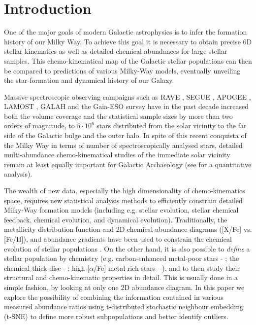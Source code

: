 \documentclass{aa}  %
\begin{document}
\section{Introduction}

One of the major goals of modern Galactic astrophysics is to infer the formation history of our Milky Way. To achieve this goal it is necessary to obtain precise 6D stellar kinematics as well as detailed chemical abundances for large stellar samples. This chemo-kinematical map of the Galactic stellar populations can then be compared to predictions of various Milky-Way models, eventually unveiling the star-formation and dynamical history of our Galaxy. 

Massive spectroscopic observing campaigns such as RAVE \citep{Steinmetz2006}, SEGUE \citep{Yanny2009}, APOGEE \citep{Majewski2017}, LAMOST \citep{Deng2012}, GALAH \citep{Martell2017} and the Gaia-ESO survey \citep{Gilmore2012} have in the past decade increased both the volume coverage and the statistical sample sizes by more than two orders of magnitude, to $5\cdot10^6$ stars distributed from the solar vicinity to the far side of the Galactic bulge and the outer halo. 
In spite of this recent conquista of the Milky Way in terms of number of spectroscopically analysed stars, detailed multi-abundance chemo-kinematical studies of the immediate solar vicinity \citep[e.g.]{Edvardsson1993, Fuhrmann1998, Fuhrmann2011, Fuhrmann2017, Adibekyan2012, Bensby2014, Nissen2015, Nissen2016, DelgadoMena2017} remain at least equally important for Galactic Archaeology (see \citealt{Lindegren2013} for a quantitative analysis).

The wealth of new data, especially the high dimensionality of chemo-kinematics space, requires new statistical analysis methods to efficiently constrain detailed Milky-Way formation models (including e.g. stellar evolution, stellar chemical feedback, chemical evolution, and dynamical evolution). Traditionally, the metallicity distribution function and 2D chemical-abundance diagrams ([X/Fe] vs. [Fe/H]), and abundance gradients have been used to constrain the chemical evolution of stellar populations \citep[e.g.][]{Pagel2009}. On the other hand, it is also possible to {\it define} a stellar population by chemistry (e.g. carbon-enhanced metal-poor stars - \citealt{Beers2005}; the chemical thick disc - \citealt{Gratton1996, Fuhrmann1998}; high-[$\alpha$/Fe] metal-rich stars - \citealt{Adibekyan2011}), and to then study their structural and chemo-kinematic properties in detail. This is usually done in a simple fashion, by looking at only one 2D abundance diagram. In this paper we explore the possibility of combining the information contained in various measured abundance ratios using t-distributed stochastic neighbour embedding (t-SNE) to define more robust subpopulations and better identify outliers. 
\end{document}
